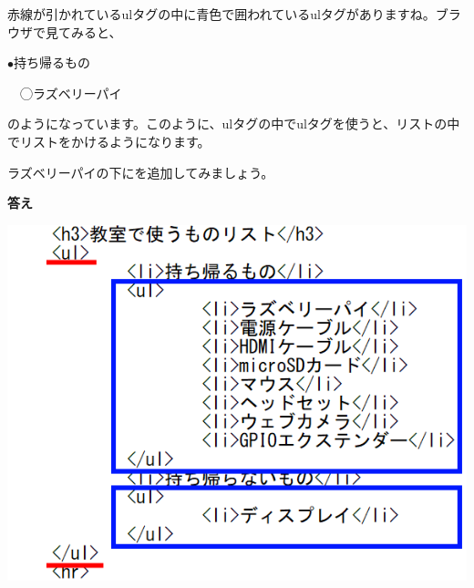 \documentclass[a4paper,12pt]{jarticle}
\begin{document}
\bigskip
\flushleft

赤線が引かれているulタグの中に青色で囲われているulタグがありますね。ブラウザで見てみると、

${\bullet}持ち帰るもの$

\ \ ◯ラズベリーパイ

のようになっています。このように、ulタグの中でulタグを使うと、リストの中でリストをかけるようになります。

ラズベリーパイの下にを追加してみましょう。


\bigskip


\clearpage\flushleft
\textbf{答え}


\bigskip

\centering
\begin{minipage}{0.45\linewidth}
  \includegraphics[width=\linewidth]{textbook-img1043.png}
\end{minipage}
\hfill
\vspace{20pt}
\end{document}
